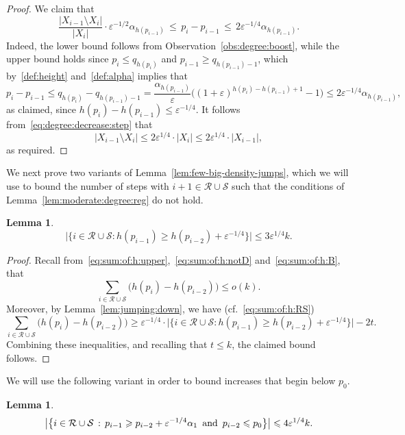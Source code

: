 \documentclass[12pt,reqno]{amsart}
\newtheorem{lemma}[theorem]{Lemma}
\theoremstyle{definition}
\theoremstyle{remark}
\def\cS{\mathcal{S}}
\newcommand\eps{\varepsilon}
\renewcommand{\le}{\leqslant}
\renewcommand{\ge}{\geqslant}
\def\eps{\varepsilon}
\def\cR{\mathcal{R}}
\begin{document}
\begin{proof}
We claim that
\begin{equation}\label{eq:degree:decrease:step}
\frac{|X_{i-1} \setminus X_i|}{|X_i|} \cdot \eps^{-1/2} \alpha_{h(p_{i-1})} \, \le \, p_i - p_{i-1} \, \le \, 2\eps^{-1/4} \alpha_{h(p_{i-1})}.
\end{equation}
Indeed, the lower bound follows from Observation~\ref{obs:degree:boost}, while the upper bound holds since $p_i \le q_{h(p_i)}$ and $p_{i-1} \ge q_{h(p_{i-1})-1}$, which by~\eqref{def:height} and~\eqref{def:alpha} implies that 
$$p_i - p_{i-1} \le q_{h(p_i)} - q_{h(p_{i-1})-1} = \frac{\alpha_{h(p_{i-1})}}{\eps} \Big( (1+\eps)^{h(p_i)- h(p_{i-1})+1} - 1 \Big) \le 2\eps^{-1/4} \alpha_{h(p_{i-1})},$$
as claimed, since $h(p_i) - h(p_{i-1}) \le \eps^{-1/4}$. It follows from~\eqref{eq:degree:decrease:step} that 
$$|X_{i-1} \setminus X_i| \le 2 \eps^{1/4} \cdot |X_i| \le 2 \eps^{1/4} \cdot |X_{i-1}|,$$
as required.
\end{proof}

We next prove two variants of Lemma~\ref{lem:few-big-density-jumps}, which we will use to bound the number of steps with $i+1 \in \cR \cup \cS$ such that the conditions of Lemma~\ref{lem:moderate:degree:reg} do not hold. 

\begin{lemma}\label{lem:few-big-regularisation-jumps} 
$$\big|\big\{ i \in \cR \cup \cS : h(p_{i-1}) \ge h(p_{i-2}) + \eps^{-1/4} \big\} \big| \le 3 \eps^{1/4} k.$$
\end{lemma}

\begin{proof}
Recall from~\eqref{eq:sum:of:h:upper},~\eqref{eq:sum:of:h:notD} and~\eqref{eq:sum:of:h:B}, that
$$\sum_{i \in \cR \cup \cS} \big( h(p_i) - h(p_{i-2}) \big) \le o(k).$$
Moreover, by Lemma~\ref{lem:jumping:down}, we have (cf.~\eqref{eq:sum:of:h:RS}) 
$$\sum_{i \in \cR \cup \cS} \big( h(p_i) - h(p_{i-2}) \big) \ge \eps^{-1/4} \cdot \big|\big\{ i \in \cR \cup \cS : h(p_{i-1}) \ge h(p_{i-2}) + \eps^{-1/4} \big\} \big| - 2t.$$ 
Combining these inequalities, and recalling that $t \le k$, the claimed bound follows.  
\end{proof}

We will use the following variant in order to bound increases that begin below $p_0$.

\begin{lemma}\label{lem:few-big-jumps:below:p0} 
$$\big|\big\{ i \in \cR \cup \cS \,:\, p_{i-1} \ge p_{i-2} + \eps^{-1/4} \alpha_1 \,\textup{ and }\, p_{i-2} \le p_0 \big\} \big| \le 4 \eps^{1/4} k.$$
\end{lemma}
\end{document}

